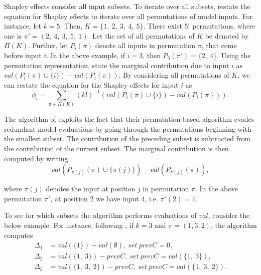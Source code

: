 Shapley effects consider all input subsets. To iterate over all subsets, \citet{SNS16} restate the equation for Shapley effects to iterate over all permutations of model inputs. For instance, let $k=5$. Then, $K=\{1,\ 2,\ 3,\ 4,\ 5\}$. There exist $5!$ permutations, where one is $\pi'=(2,\ 4,\ 3,\ 5,\ 1)$. Let the set of all permutations of $K$ be denoted by $\Pi(K)$. Further, let $P_i(\pi)$ denote all inputs in permutation $\pi$, that come before input $i$. In the above example, if $i=3$, then $P_3(\pi')=\{2,\ 4\}$. Using the permutation representation, \citet{SNS16} state the marginal contribution due to input $i$ as $val(P_i(\pi) \cup\{i\}) - val(P_i(\pi))$. By considering all permutations of $K$, we can restate the equation for the Shapley effects for input $i$ as
\begin{equation}
\phi_i=\sum_{\pi \in \Pi(K)} (k!)^{-1} (val(P_i(\pi) \cup\{i\}) - val(P_i(\pi))).
\end{equation}

The algorithm of \citet{SNS16} exploits the fact that their permutation-based algorithm evades redundant model evaluations by going through the permutations beginning with the smallest subset. The contribution of the preceding subset is subtracted from the contribution of the current subset. The marginal contribution is then computed by writing
\begin{equation}
val(P_{\pi(j)}(\pi) \cup \{\pi(j)\}) - val(P_{\pi(j)}(\pi)),
\end{equation}

\noindent where $\pi(j)$ denotes the input at position $j$ in permutation $\pi$. In the above permutation $\pi'$, at position 2 we have input 4, i.e. $\pi'(2)=4$.

To see for which subsets the algorithm performs evaluations of $val$, consider the below example. For instance, following \citet{SNS16}, if $k=3$ and $\pi=(1, 3, 2)$, the algorithm computes
\begin{align*}
\Delta_1 &=val(\{1\})-val(\emptyset),\ set\ prevC=0, \\
\Delta_2 &=val(\{1,\ 3\})-prevC,\ set\ prevC=val(\{1,\ 3\}), \\
\Delta_3 &=val(\{1,\ 3,\ 2\})-prevC,\ set\ prevC=val(\{1,\ 3,\ 2\}).
\end{align*}

